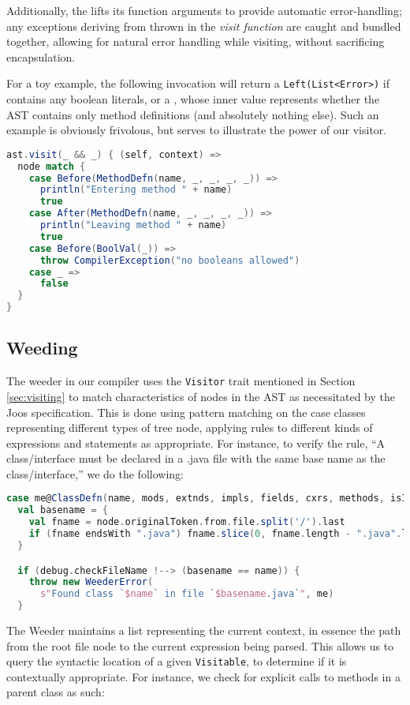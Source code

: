 \documentclass{article}
\begin{document}
Additionally, the \value{Visitor} lifts its function arguments to provide automatic error-handling; any exceptions
deriving from  thrown in the \textit{visit function} are caught and bundled together, allowing for
natural error handling while visiting, without sacrificing encapsulation.

For a toy example, the following invocation will return a \texttt{Left(List<Error>)} if \value{ast} contains any boolean
literals, or a \value{Right(Boolean)}, whose inner value represents whether the AST contains only method definitions
(and absolutely nothing else). Such an example is obviously frivolous, but serves to illustrate the power of our
visitor.

\begin{lstlisting}[language=Scala]
ast.visit(_ && _) { (self, context) =>
  node match {
    case Before(MethodDefn(name, _, _, _, _)) =>
      println("Entering method " + name)
      true
    case After(MethodDefn(name, _, _, _, _)) =>
      println("Leaving method " + name)
      true
    case Before(BoolVal(_)) =>
      throw CompilerException("no booleans allowed")
    case _ =>
      false
  }
}
\end{lstlisting}



\subsection{Weeding}
The weeder in our compiler uses the {\tt Visitor} trait mentioned in Section \ref{sec:visiting} to match
characteristics of nodes in the AST as necessitated by the Joos specification. This is done using pattern matching
on the case classes representing different types of tree node, applying rules to different kinds of expressions and
statements as appropriate. For instance, to verify the rule, ``A class/interface must be declared in a
.java file with the same base name as the class/interface,'' we do the following:

\begin{lstlisting}[language=Scala]
case me@ClassDefn(name, mods, extnds, impls, fields, cxrs, methods, isInterface) =>
  val basename = {
    val fname = node.originalToken.from.file.split('/').last
    if (fname endsWith ".java") fname.slice(0, fname.length - ".java".length) else ""
  }

  if (debug.checkFileName !--> (basename == name)) {
    throw new WeederError(
      s"Found class `$name` in file `$basename.java`", me)
  }
\end{lstlisting}
The Weeder maintains a list representing the current context, in essence the path from
the root file node to the current expression being parsed. This allows us to query the syntactic
location of a given {\tt Visitable}, to determine if it is contextually appropriate. For instance,
we check for explicit calls to methods in a parent class as such:
\end{document}
